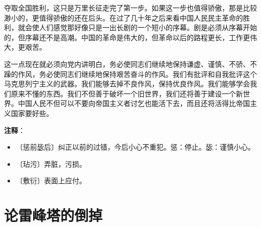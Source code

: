 \documentclass[12pt,UTF-8,openany]{ctexbook}
\begin{document}
\begin{normalsize}
    夺取全国胜利，这只是万里长征走完了第一步。如果这一步也值得骄傲，那是比较渺小的，更值得骄傲的还在后头。在过了几十年之后来看中国人民民主革命的胜利，就会使人们感觉那好像只是一出长剧的一个短小的序幕。剧是必须从序幕开始的，但序幕还不是高潮。中国的革命是伟大的，但革命以后的路程更长，工作更伟大，更艰苦。
    
    这一点现在就必须向党内讲明白，务必使同志们继续地保持谦虚、谨慎、不骄、不躁的作风，务必使同志们继续地保持艰苦奋斗的作风。我们有批评和自我批评这个马克思列宁主义的武器。我们能够去掉不良作风，保持优良作风。我们能够学会我们原来不懂的东西。我们不但善于破坏一个旧世界，我们还将善于建设一个新世界。中国人民不但可以不要向帝国主义者讨乞也能活下去，而且还将活得比帝国主义国家要好些。
    
\end{normalsize}


\newpage

\textbf{注释}：

\vspace{-1em}

\begin{itemize}
    \setlength\itemsep{-0.2em}
    \item 〔惩前毖后〕纠正以前的过错，今后小心不重犯。惩：停止。毖：谨慎小心。
    \item 〔玷污〕弄脏，污损。
    \item 〔敷衍〕表面上应付。
\end{itemize}

\chapter{论雷峰塔的倒掉}
\end{document}

